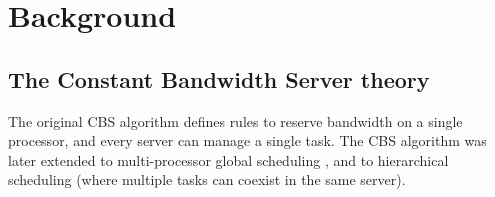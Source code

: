 \chapter{Background\label{chap:background}}


\section{The Constant Bandwidth Server theory\label{sec:CBS}}
%
% 

%
%
The original
CBS algorithm \cite{AbeniB98} defines rules to reserve bandwidth on a
single processor, and every server can manage a single task. The CBS
algorithm was later extended to multi-processor global scheduling
\cite{baruah2002implementing}, and to hierarchical scheduling
\cite{lipari2001hierarchical,journals/jec/LipariB05,Lip05-comp} (where
multiple tasks can coexist in the same server).

